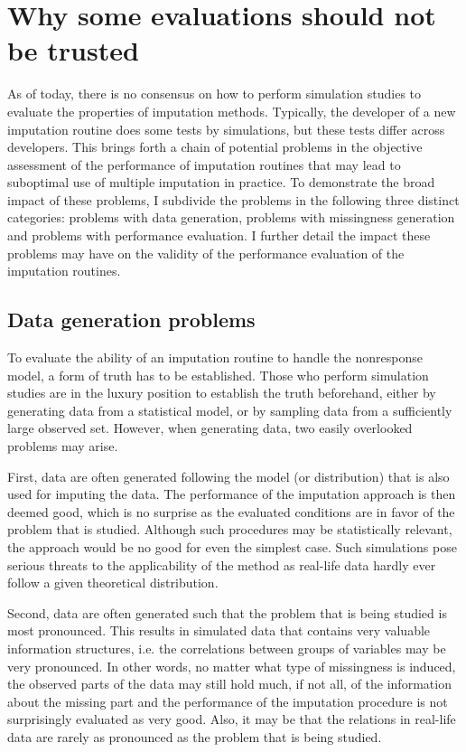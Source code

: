 \documentclass[12pt, a4paper]{article}
\begin{document}
\section*{Why some evaluations should not be trusted}
As of today, there is no consensus on how to perform simulation studies to evaluate the properties of imputation methods. Typically, the developer of a new imputation routine does some tests by simulations, but these tests differ across developers. This brings forth a chain of potential problems in the objective assessment of the performance of imputation routines that may lead to suboptimal use of multiple imputation in practice. To demonstrate the broad impact of these problems, I subdivide the problems in the following three distinct categories: problems with data generation, problems with missingness generation and problems with performance evaluation. I further detail the impact these problems may have on the validity of the performance evaluation of the imputation routines. 

\subsection*{Data generation problems}
To evaluate the ability of an imputation routine to handle the nonresponse model, a form of truth has to be established. Those who perform simulation studies are in the luxury position to establish the truth beforehand, either by generating data from a statistical model, or by sampling data from a sufficiently large observed set. However, when generating data, two easily overlooked problems may arise.  

First, data are often generated following the model (or distribution) that is also used for imputing the data. The performance of the imputation approach is then deemed good, which is no surprise as the evaluated conditions are in favor of the problem that is studied. Although such procedures may be statistically relevant, the approach would be no good for even the simplest case. Such simulations pose serious threats to the applicability of the method as real-life data hardly ever follow a given theoretical distribution. 

Second, data are often generated such that the problem that is being studied is most pronounced. This results in simulated data that contains very valuable information structures, i.e. the correlations between groups of variables may be very pronounced. In other words, no matter what type of missingness is induced, the observed parts of the data may still hold much, if not all, of the information about the missing part and the performance of the imputation procedure is not surprisingly evaluated as very good. Also, it may be that the relations in real-life data are rarely as pronounced as the problem that is being studied.
\end{document}
